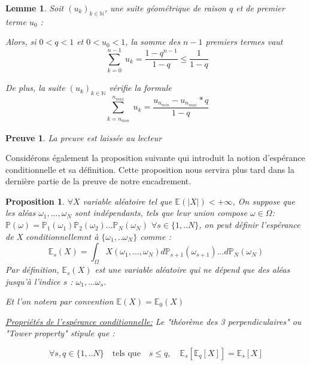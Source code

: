\documentclass{article}
\newtheorem{prop}{Proposition}
\newtheorem{preuve}{Preuve}
\begin{document}
\newtheorem{theo56}{Lemme}
\begin{theo56}

Soit $(u_k)_{k \in \mathbb{N}}$, une suite géométrique de raison $q$ et de premier terme $u_0$ :

\bigskip

Alors, si $0<q<1$ et $0<u_0<1$,  la somme des $n-1$ premiers termes vaut 
\begin{equation}
    \sum\limits_{\substack {k=0}}^{n-1} u_k = \frac{1-q^{n-1}}{1-q} \leq \frac{1}{1-q}
\end{equation}


\bigskip

De plus, la suite $(u_k)_{k \in \mathbb{N}}$ vérifie la formule 
\begin{equation}
    \sum\limits_{\substack {k=n_{min}}}^{n_{max}} u_k = \frac{u_n_{min} - u_{n_{max}} * q}{1-q}
\end{equation}


\end{theo56}


\bigskip

\begin{preuve} 
La preuve est laissée au lecteur
\end{preuve}

Considérons également la proposition suivante qui introduit la notion d'espérance conditionnelle et sa définition. Cette proposition nous servira plus tard dans la dernière partie de la preuve de notre encadrement.

\begin{prop}
$\forall X$ variable aléatoire tel que $\mathbb{E}(\lvert X \lvert) < + \infty$, 
On suppose que les aléas $\omega_1,..., \omega_N$  sont indépendants, tels que leur union compose $\omega \in \Omega$: $\mathbb{P}(\omega)=\mathbb{P}_1(\omega_1) \mathbb{P}_2(\omega_2)...\mathbb{P}_N(\omega_N)$
$\forall s \in  \{1,..N\}$, on peut définir l'espérance de X conditionnellemnt à $\{\omega_1,..\omega_N\}$ comme :
\begin{equation*}
    \mathbb{E}_s (X) = \int_{\Omega} X(\omega_1,..., \omega_N) d \mathbb{P}_{s+1}(\omega_{s+1})... d\mathbb{P}_N(\omega_N)
\end{equation*}
\begin{equation}
    \label{eq:esperance}
\end{equation}
Par définition, $\mathbb{E}_s (X) $ est une variable aléatoire qui ne dépend que des aléas jusqu'à l'indice $s$ : $\omega_1,...\omega_{s}$. 

Et l'on notera par convention $\mathbb{E}(X)=\mathbb{E}_0(X)$

\bigskip

\underline{Propriétés de l'espérance conditionnelle:}
Le "théorème des 3 perpendiculaires" ou "Tower property" stipule que :

\begin{equation*}
   \forall s,q \in \{1,..N\}  \quad \text{tels que} \quad s\leq q, \quad \mathbb{E}_s[\mathbb{E}_q[X]]= \mathbb{E}_s[X]
\end{equation*}
\end{prop}
\end{document}
